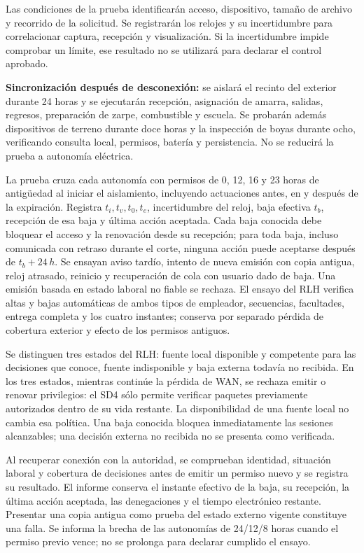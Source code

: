 Las condiciones de la prueba identificarán acceso, dispositivo, tamaño de archivo y recorrido de la solicitud. Se registrarán los relojes y su incertidumbre para correlacionar captura, recepción y visualización. Si la incertidumbre impide comprobar un límite, ese resultado no se utilizará para declarar el control aprobado.

\textbf{Sincronización después de desconexión:} se aislará el recinto del exterior durante 24 horas y se ejecutarán recepción, asignación de amarra, salidas, regresos, preparación de zarpe, combustible y escuela. Se probarán además dispositivos de terreno durante doce horas y la inspección de boyas durante ocho, verificando consulta local, permisos, batería y persistencia. No se reducirá la prueba a autonomía eléctrica.

La prueba cruza cada autonomía con permisos de 0, 12, 16 y 23 horas de antigüedad al iniciar el aislamiento, incluyendo actuaciones antes, en y después de la expiración. Registra \(t_i,t_v,t_0,t_e\), incertidumbre del reloj, baja efectiva \(t_b\), recepción de esa baja y última acción aceptada. Cada baja conocida debe bloquear el acceso y la renovación desde su recepción; para toda baja, incluso comunicada con retraso durante el corte, ninguna acción puede aceptarse después de \(t_b+24\,h\). Se ensayan aviso tardío, intento de nueva emisión con copia antigua, reloj atrasado, reinicio y recuperación de cola con usuario dado de baja. Una emisión basada en estado laboral no fiable se rechaza. El ensayo del RLH verifica altas y bajas automáticas de ambos tipos de empleador, secuencias, facultades, entrega completa y los cuatro instantes; conserva por separado pérdida de cobertura exterior y efecto de los permisos antiguos.

Se distinguen tres estados del RLH: fuente local disponible y competente para las decisiones que conoce, fuente indisponible y baja externa todavía no recibida. En los tres estados, mientras continúe la pérdida de WAN, se rechaza emitir o renovar privilegios: el SD4 sólo permite verificar paquetes previamente autorizados dentro de su vida restante. La disponibilidad de una fuente local no cambia esa política. Una baja conocida bloquea inmediatamente las sesiones alcanzables; una decisión externa no recibida no se presenta como verificada.

Al recuperar conexión con la autoridad, se comprueban identidad, situación laboral y cobertura de decisiones antes de emitir un permiso nuevo y se registra su resultado. El informe conserva el instante efectivo de la baja, su recepción, la última acción aceptada, las denegaciones y el tiempo electrónico restante. Presentar una copia antigua como prueba del estado externo vigente constituye una falla. Se informa la brecha de las autonomías de 24/12/8 horas cuando el permiso previo vence; no se prolonga para declarar cumplido el ensayo.

